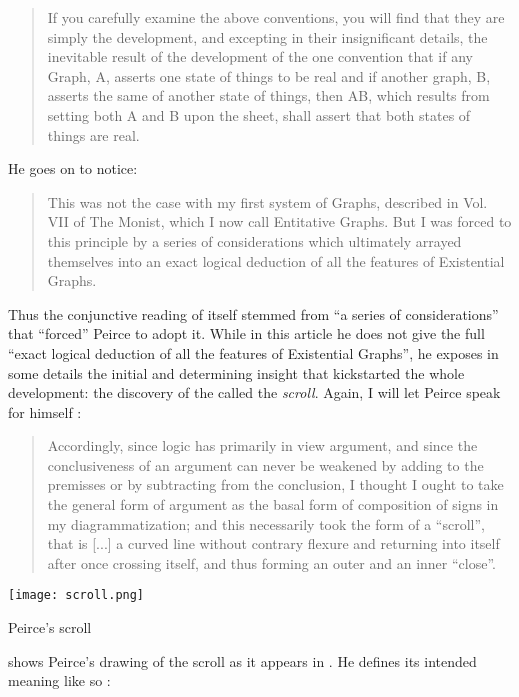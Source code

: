 \begin{quote}
If you carefully examine the above conventions, you will find that they are
simply the development, and excepting in their insignificant details, the
inevitable result of the development of the one convention that if any Graph, A,
asserts one state of things to be real and if another graph, B, asserts the same
of another state of things, then AB, which results from setting both A and B
upon the sheet, shall assert that both states of things are real.
\end{quote}

He goes on to notice:

\begin{quote}
   This was not the case with my first system of Graphs, described in Vol. VII
of The Monist, which I now call Entitative Graphs. But I was forced to this
principle by a series of considerations which ultimately arrayed themselves into
an exact logical deduction of all the features of Existential Graphs.
\end{quote}

Thus the conjunctive reading of  itself stemmed from ``a series of
considerations'' that ``forced'' Peirce to adopt it. While in this article he
does not give the full ``exact logical deduction of all the features of
Existential Graphs'', he exposes in some details the initial and determining
insight that kickstarted the whole development: the discovery of the  called
the \emph{scroll}. Again, I will let Peirce speak for
himself \cite[pp.~533--534]{peirce_prolegomena_1906}:

\begin{quote}
  Accordingly, since logic has primarily in view argument, and since the
conclusiveness of an argument can never be weakened by adding to the premisses
or by subtracting from the conclusion, I thought I ought to take the general
form of argument as the basal form of composition of signs in my
diagrammatization; and this necessarily took the form of a ``scroll'', that is
[...] a curved line without contrary flexure and returning into itself after
once crossing itself, and thus forming an outer and an inner ``close''.
\end{quote}

\begin{marginfigure}
  \texttt{[image: scroll.png]}
  \caption{Peirce's scroll}
\end{marginfigure}

 shows Peirce's drawing of the scroll as it appears in
\cite[Fig.~5]{peirce_prolegomena_1906}. He defines its intended meaning like so
\cite[p.~534--535]{peirce_prolegomena_1906}:

